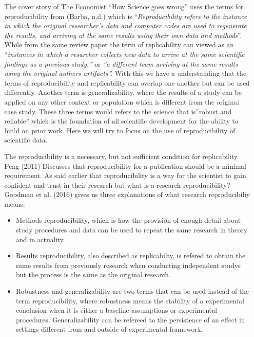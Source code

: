 \documentclass[
  british,
  a4paper,
]{article}
\begin{document}
The cover story of The Economist ``How Science goes wrong'' uses the
terms for reproducibility from (Barba, n.d.) which is
``\emph{Reproducibility refers to the instance in which the original
researcher's data and computer codes are used to regenerate the results,
and arriving at the same results using their own data and methods}''.
While from the same review paper the term of replicability can viewed as
an ``\emph{instances in which a resarcher collects new data to arrive at
the same scientific findings as a previous study,''} or \emph{''a
different team arriving at the same results using the original authors
artifacts''.} With this we have a understanding that the terms of
reproducibility and replicability can overlap one another but can be
used differently. Another term is generalizability, where the results of
a study can be applied on any other context or population which is
different from the original case study. These three terms would refers
to the science that is''robust and reliable'' which is the foundation of
all scientific development for the ability to build on prior work. Here
we will try to focus on the use of reproducibility of scientific data.

The reproducibility is a necessary, but not sufficient condition for
replicability. Peng (2011) Discusses that reproducibility for a
publication should be a minimal requirement. As said earlier that
reproducibility is a way for the scientist to gain confident and trust
in their research but what is a research reproducibility? Goodman et al.
(2016) gives us three explanations of what research reproducibiliy
means:

\begin{itemize}
\item
  Methods reproducibility, which is how the provision of enough detail
  about study procedures and data can be used to repeat the same
  research in theory and in actuality.
\item
  Results reproducibility, also described as replicabilty, is refered to
  obtain the same results from previously research when conducting
  independent studys but the process is the same as the original
  research.
\item
  Robustness and generalizability are two terms that can be used instead
  of the term reproducibility, where robustness means the stability of a
  experimental conclusion when it is either a baseline assumptions or
  experimental procedures. Generalizability can be refereed to the
  persistence of an effect in settings different from and outside of
  experimental framework.
\end{itemize}
\end{document}
